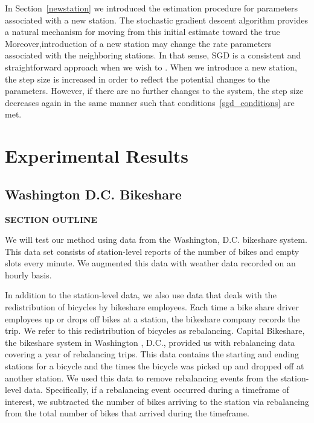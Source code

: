 \documentclass{acm_proc_article-sp}
\begin{document}
In Section~\ref{newstation} we introduced the estimation procedure for parameters associated with a new station.  The stochastic gradient descent algorithm provides a natural mechanism for moving from this initial estimate toward the true Moreover,introduction of a new station may change the rate parameters associated with the neighboring stations.  In that sense, SGD is a consistent and straightforward approach when we wish to .  When we introduce a new station, the step size is increased in order to reflect the potential changes to the parameters.  However, if there are no further changes to the system, the step size decreases again in the same manner such that conditions~\eqref{sgd_conditions} are met.



\section{Experimental Results}

\vspace{0.25cm}

\subsection{Washington D.C. Bikeshare}
\vspace{0.25cm}
{\bf SECTION OUTLINE}

We will test our method using data from the Washington, D.C. bikeshare system. This data set consists of station-level reports of the number of bikes and empty slots every minute. We augmented this data with weather data recorded on an hourly basis.

In addition to the station-level data, we also use data that deals with the redistribution of bicycles by bikeshare employees. Each time a bike share driver employees up or drops off bikes at a station, the bikeshare company records the trip. We refer to this redistribution of bicycles as rebalancing. Capital Bikeshare, the bikeshare system in Washington , D.C.,  provided us with rebalancing data covering a year of rebalancing trips. This data contains the starting and ending stations for a bicycle and the times the bicycle was picked up and dropped off at another station. We used this data to remove rebalancing events from the station-level data. Specifically, if a rebalancing event occurred during a timeframe of interest, we subtracted the number of bikes arriving to the station via rebalancing from the total number of bikes that arrived during the timeframe.
\end{document}
